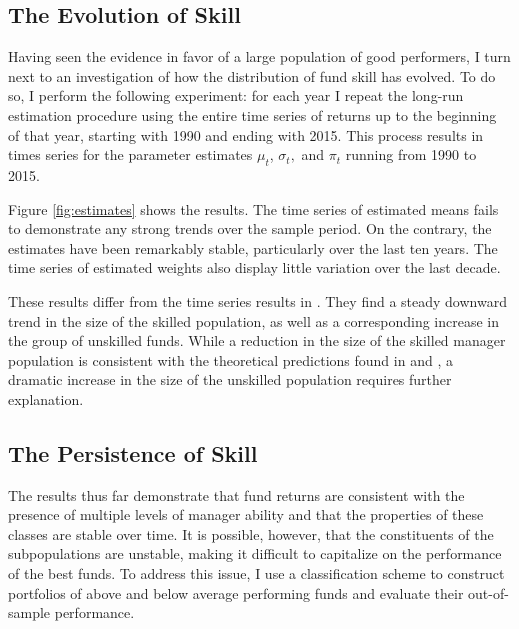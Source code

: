 	\subsection{The Evolution of Skill}
		Having seen the evidence in favor of a large population of good performers, I turn next to an investigation of how the distribution of fund skill has evolved. To do so, I perform the following experiment: for each year I repeat the long-run estimation procedure using the entire time series of returns up to the beginning of that year, starting with 1990 and ending with 2015. This process results in times series for the parameter estimates $\mu_t$, $\sigma_t,$ and $\pi_t$ running from 1990 to 2015.

		Figure \ref{fig:estimates} shows the results. The time series of estimated means fails to demonstrate any strong trends over the sample period. On the contrary, the estimates have been remarkably stable, particularly over the last ten years. The time series of estimated weights also display little variation over the last decade.

		These results differ from the time series results in \citet{Barras2010}.  They find a steady downward trend in the size of the skilled population, as well as a corresponding increase in the group of unskilled funds.  While a reduction in the size of the skilled manager population is consistent with the theoretical predictions found in \citet{Berk2004} and \citet{Pastor2012}, a dramatic increase in the size of the unskilled population requires further explanation.

	\subsection{The Persistence of Skill}
		The results thus far demonstrate that fund returns are consistent with the presence of multiple levels of manager ability and that the properties of these classes are stable over time. It is possible, however, that the constituents of the subpopulations are unstable, making it difficult to capitalize on the performance of the best funds. To address this issue, I use a classification scheme to construct portfolios of above and below average performing funds and evaluate their out-of-sample performance.

